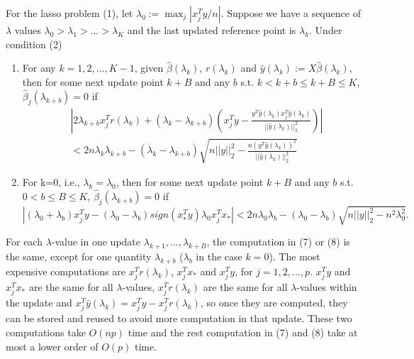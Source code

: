 \begin{theorem}
    For the lasso problem (1), let $\lambda_0:=\max_j|x_j^Ty/n|$. Suppose we have a sequence of $\lambda$ values $\lambda_0>\lambda_1>...>\lambda_K$ and the last updated reference point is $\lambda_k$. Under condition (2)
    \begin{enumerate}
        \item For any $k=1,2,...,K-1$, given $\hat{\beta}(\lambda_k)$, $r(\lambda_k)$ and $\hat{y}(\lambda_k):=X\hat{\beta}(\lambda_k)$, then for some next update point $k+B$ and any $b$ s.t. $k<k+b\leq k+B\leq K$, $\hat{\beta}_j(\lambda_{k+b})=0$ if
        \begin{equation}
            \begin{split}
                &\left|2\lambda_{k+b}x_j^Tr(\lambda_k)+(\lambda_k-\lambda_{k+b})\left( x_j^Ty-\frac{y^T\hat{y}(\lambda_k)x_j^T\hat{y}(\lambda_k)}{||\hat{y}(\lambda_k)||_2^2}\right)\right|\\&<2n\lambda_k\lambda_{k+b}-(\lambda_k-\lambda_{k+b})\sqrt{n||y||_2^2-\frac{n(y^T\hat{y}(\lambda_k))^2}{||\hat{y}(\lambda_k)||_2^2}}
            \end{split}
        \end{equation}
        \item For k=0, i.e., $\lambda_k=\lambda_0$, then for some next update point $k+B$ and any $b$ s.t. $0<b\leq B\leq K$, $\hat{\beta}_j(\lambda_{k+b})=0$ if
        \begin{equation}
        |(\lambda_0+\lambda_b)x_j^Ty-(\lambda_0-\lambda_b)sign(x_*^Ty)\lambda_0x_j^Tx_*|<2n\lambda_0\lambda_b-(\lambda_0-\lambda_b)\sqrt{n||y||_2^2-n^2\lambda_0^2}.
    \end{equation}
    \end{enumerate}
\end{theorem}

For each $\lambda$-value in one update $\lambda_{k+1},...,\lambda_{k+B}$, the computation in (7) or (8) is the same, except for one quantity $\lambda_{k+b}$ ($\lambda_b$ in the case $k=0$). The most expensive computations are $x_j^Tr(\lambda_k)$, $x_j^Tx_*$ and $x_j^Ty$, for $j=1,2,...,p$. $x_j^Ty$ and $x_j^Tx_*$ are the same for all $\lambda$-values, $x_j^Tr(\lambda_k)$ are the same for all $\lambda$-values within the update and $x_j^T\hat{y}(\lambda_k)=x_j^Ty-x_j^Tr(\lambda_k)$, so once they are computed, they can be stored and reused to avoid more computation in that update. These two computations take $O(np)$ time and the rest computation in (7) and (8) take at most a lower order of $O(p)$ time.

